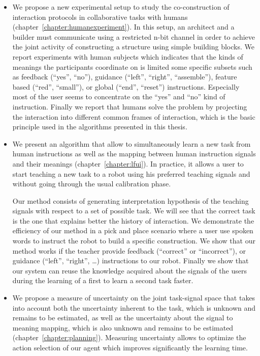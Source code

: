 \begin{itemize}

\item We propose a new experimental setup to study the co-construction of interaction protocols in collaborative tasks with humans \cite{vollmer2014studying} (chapter~\ref{chapter:humanexperiment}). In this setup, an architect and a builder must communicate using a restricted n-bit channel in order to achieve the joint activity of constructing a structure using simple building blocks. We report experiments with human subjects which indicates that the kinds of meanings the participants coordinate on is limited some specific subsets such as feedback (``yes'', ``no''), guidance (``left'', ``right'', ``assemble''), feature based (``red'', ``small''), or global (``end'', ``reset'') instructions. Especially most of the user seems to concentrate on the ``yes'' and ``no'' kind of instruction. Finally we report that humans solve the problem by projecting the interaction into different common frames of
interaction, which is the basic principle used in the algorithms presented in this thesis.

\item  We present an algorithm that allow to simultaneously learn a new task from human instructions as well as the mapping between human instruction signals and their meanings \cite{grizou2013interactive,grizou2013robot,grizou2014robot,grizou2014calibration,grizou2014interactive} (chapter~\ref{chapter:lfui}). In practice, it allows a user to start teaching a new task to a robot using his preferred teaching signals and without going through the usual calibration phase.  

Our method consists of generating interpretation hypothesis of the teaching signals with respect to a set of possible task. We will see that the correct task is the one that explains better the history of interaction. We demonstrate the efficiency of our method in a pick and place scenario where a user use spoken words to instruct the robot to build a specific construction. We show that our method works if the teacher provide feedback (``correct'' or ``incorrect''), or guidance (``left'', ``right'', \ldots) instructions to our robot. Finally we show that our system can reuse the knowledge acquired about the signals of the users during the learning of a first to learn a second task faster.

\item We propose a measure of uncertainty on the joint task-signal space that takes into account both the uncertainty inherent to the task, which is unknown and remains to be estimated, as well as the uncertainty about the signal to meaning mapping, which is also unknown and remains to be estimated \cite{grizou2014calibration,grizou2014interactive} (chapter~\ref{chapter:planning}). Measuring uncertainty allows to optimize the action selection of our agent which improves significantly the learning time.


\end{itemize}
